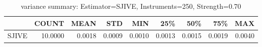 \begin{table}[ht]
\centering
\caption{variance summary: Estimator=SJIVE, Instruments=250, Strength=0.70}
\begin{tabular}{lrrrrrrrr}
\toprule
 & COUNT & MEAN & STD & MIN & 25\% & 50\% & 75\% & MAX \\
\midrule
SJIVE & 10.0000 & 0.0018 & 0.0009 & 0.0010 & 0.0013 & 0.0015 & 0.0019 & 0.0040 \\
\bottomrule
\end{tabular}
\end{table}
